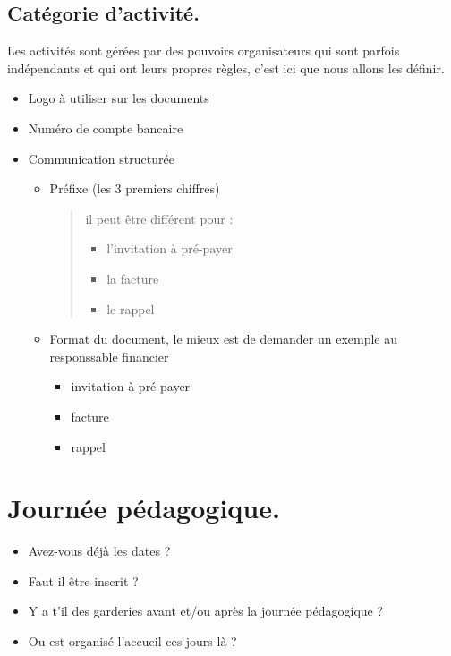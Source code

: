 \documentclass[letterpaper,10pt,english]{sphinxmanual}
\begin{document}
\subsection{Catégorie d'activité.}
\label{checklist:categorie-d-activite}
Les activités sont gérées par des pouvoirs organisateurs qui sont parfois indépendants et qui ont leurs propres règles,
c'est ici que nous allons les définir.
\begin{itemize}
\item {} 
Logo à utiliser sur les documents

\item {} 
Numéro de compte bancaire

\item {} 
Communication structurée
\begin{itemize}
\item {} 
Préfixe (les 3 premiers chiffres)
\begin{quote}

il peut être différent pour :
\begin{itemize}
\item {} 
l'invitation à pré-payer

\item {} 
la facture

\item {} 
le rappel

\end{itemize}
\end{quote}

\item {} 
Format du document, le mieux est de demander un exemple au responssable financier
\begin{itemize}
\item {} 
invitation à pré-payer

\item {} 
facture

\item {} 
rappel

\end{itemize}

\end{itemize}

\end{itemize}


\section{Journée pédagogique.}
\label{checklist:journee-pedagogique}\begin{itemize}
\item {} 
Avez-vous déjà les dates ?

\item {} 
Faut il être inscrit ?

\item {} 
Y a t'il des garderies avant et/ou après la journée pédagogique ?

\item {} 
Ou est organisé l'accueil ces jours là ?

\end{itemize}
\end{document}
